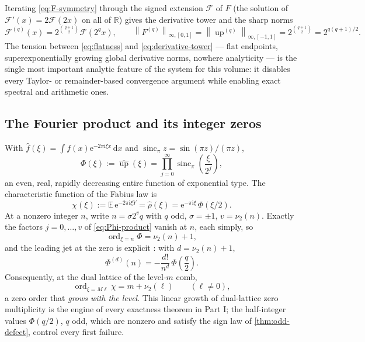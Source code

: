 \documentclass[11pt,oneside]{article}
\numberwithin{equation}{section}
\theoremstyle{definition}
\theoremstyle{remark}
\newcommand{\R}{\mathbb R}
\newcommand{\E}{\mathbb E}
\newcommand{\dd}{\,\mathrm d}
\newcommand{\e}{\mathrm e}
\newcommand{\ii}{\mathrm i}
\newcommand{\Up}{\operatorname{up}}
\newcommand{\sincpi}{\operatorname{sinc}_{\pi}}
\newcommand{\vtwo}{\nu_2}
\newcommand{\norm}[1]{\left\lVert #1\right\rVert}
\DeclareMathOperator{\ord}{ord}
\begin{document}
Iterating \eqref{eq:F-symmetry} through the signed extension
$\mathcal F$ of $F$ (the solution of $\mathcal F'(x)=2\mathcal F(2x)$ on
all of $\R$) gives the derivative tower and the sharp norms
\begin{equation}
 \mathcal F^{(q)}(x)=2^{\binom{q+1}{2}}\mathcal F(2^qx),
 \qquad
 \norm{F^{(q)}}_{\infty,[0,1]}
 =\norm{\Up^{(q)}}_{\infty,[-1,1]}
 =2^{\binom{q+1}{2}}=2^{q(q+1)/2}.
 \label{eq:derivative-tower}
\end{equation}
The tension between \eqref{eq:flatness} and
\eqref{eq:derivative-tower} --- flat endpoints, superexponentially
growing global derivative norms, nowhere analyticity --- is the single
most important analytic feature of the system for this volume: it
disables every Taylor- or remainder-based convergence argument while
enabling exact spectral and arithmetic ones.

\subsection{The Fourier product and its integer zeros}
\label{sec:fourier}

With $\widehat f(\xi)=\int f(x)\e^{-2\pi\ii\xi x}\dd x$ and
$\sincpi z=\sin(\pi z)/(\pi z)$,
\begin{equation}
 \Phi(\xi):=\widehat{\Up}(\xi)
 =\prod_{j=0}^{\infty}\sincpi\!\left(\frac{\xi}{2^j}\right),
 \label{eq:Phi-product}
\end{equation}
an even, real, rapidly decreasing entire function of exponential type.
The characteristic function of the Fabius law is
\begin{equation}
 \chi(\xi):=\E\,\e^{-2\pi\ii\xi Y}
 =\widehat\rho(\xi)
 =\e^{-\pi\ii\xi}\,\Phi(\xi/2).
 \label{eq:chi-Phi}
\end{equation}
At a nonzero integer $n$, write $n=\sigma2^{v}q$ with $q$ odd,
$\sigma=\pm1$, $v=\vtwo(n)$.  Exactly the factors
$j=0,\dots,v$ of \eqref{eq:Phi-product} vanish at $n$, each simply, so
\begin{equation}
 \ord_{\xi=n}\Phi=\vtwo(n)+1,
 \label{eq:Phi-zero-order}
\end{equation}
and the leading jet at the zero is explicit \cite{ProveItPrimary}:
with $d=\vtwo(n)+1$,
\begin{equation}
 \Phi^{(d)}(n)
 =-\frac{d!}{n^{d}}\,\Phi\!\left(\frac q2\right).
 \label{eq:integer-leading-jet}
\end{equation}
Consequently, at the dual lattice of the level-$m$ comb,
\begin{equation}
 \ord_{\xi=M\ell}\chi=m+\vtwo(\ell)
 \qquad(\ell\ne0),
 \label{eq:chi-zero-order}
\end{equation}
a zero order that \emph{grows with the level}.  This linear growth of
dual-lattice zero multiplicity is the engine of every exactness theorem
in Part I; the half-integer values $\Phi(q/2)$, $q$ odd, which are
nonzero and satisfy the sign law of \cref{thm:odd-defect}, control every
first failure.
\end{document}
